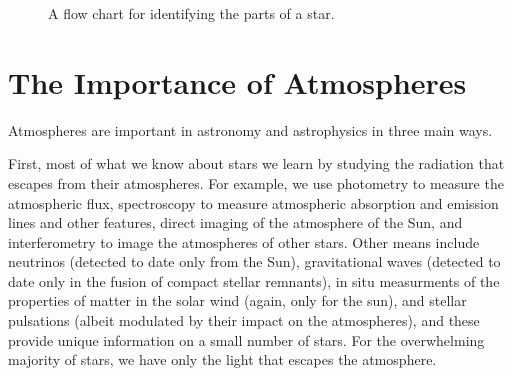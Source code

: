 \begin{figure}
\begin{center}
\end{center}
\caption{A flow chart for identifying the parts of a star.}
\label{fig-parts-of-a-star}
\end{figure}


\newslide
\section{The Importance of Atmospheres}

Atmospheres are important in astronomy and astrophysics in three main ways.

\newslide

First, most of what we know about stars we learn by studying the radiation that escapes from their atmospheres. For example, we use photometry to measure the atmospheric flux, spectroscopy to measure atmospheric absorption and emission lines and other features, direct imaging of the atmosphere of the Sun, and interferometry to image the atmospheres of other stars. Other means include neutrinos (detected to date only from the Sun), gravitational waves (detected to date only in the fusion of compact stellar remnants), in situ measurments of the properties of matter in the solar wind (again, only for the sun), and stellar pulsations (albeit modulated by their impact on the atmospheres), and these provide unique information on a small number of stars. For the overwhelming majority of stars, we have only the light that escapes the atmosphere. 

